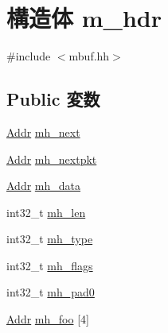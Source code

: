 \hypertarget{structtru64_1_1m__hdr}{
\section{構造体 m\_\-hdr}
\label{structtru64_1_1m__hdr}
}


{\ttfamily \#include $<$mbuf.hh$>$}\subsection*{Public 変数}
\begin{DoxyCompactItemize}
\item 
\hyperlink{base_2types_8hh_af1bb03d6a4ee096394a6749f0a169232}{Addr} \hyperlink{structtru64_1_1m__hdr_ad797243dd78f7061d25a709ecdbf2bb5}{mh\_\-next}
\item 
\hyperlink{base_2types_8hh_af1bb03d6a4ee096394a6749f0a169232}{Addr} \hyperlink{structtru64_1_1m__hdr_a556f71f4c34489f582b42c8bc09615c3}{mh\_\-nextpkt}
\item 
\hyperlink{base_2types_8hh_af1bb03d6a4ee096394a6749f0a169232}{Addr} \hyperlink{structtru64_1_1m__hdr_a053ccf16865458de6b9eb8fd4b765346}{mh\_\-data}
\item 
int32\_\-t \hyperlink{structtru64_1_1m__hdr_a381eafc36801c3ac96b5520858d87d8e}{mh\_\-len}
\item 
int32\_\-t \hyperlink{structtru64_1_1m__hdr_a94275c0b9ce632d976cc995faf5a3b47}{mh\_\-type}
\item 
int32\_\-t \hyperlink{structtru64_1_1m__hdr_a80b6e119c30e3de5b0f6d695e53130a8}{mh\_\-flags}
\item 
int32\_\-t \hyperlink{structtru64_1_1m__hdr_a06dec93c11e6b3e4cfe5f8186b670cb8}{mh\_\-pad0}
\item 
\hyperlink{base_2types_8hh_af1bb03d6a4ee096394a6749f0a169232}{Addr} \hyperlink{structtru64_1_1m__hdr_a38516b1d2921e2d30f0c99fce931ecee}{mh\_\-foo} \mbox{[}4\mbox{]}
\end{DoxyCompactItemize}


